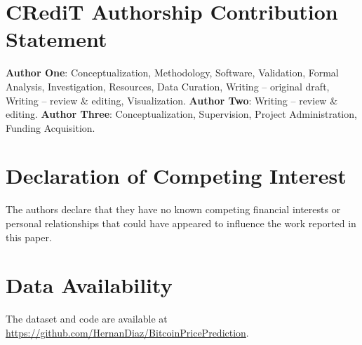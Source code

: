 \documentclass[final,3p,times,authoryear]{elsarticle}
\begin{document}
\section*{CRediT Authorship Contribution Statement}

\textbf{Author One}: Conceptualization, Methodology, Software,
Validation, Formal Analysis, Investigation, Resources, Data Curation,
Writing -- original draft, Writing -- review \& editing, Visualization.
\textbf{Author Two}: Writing -- review \& editing.
\textbf{Author Three}: Conceptualization, Supervision, Project Administration,
Funding Acquisition.

\section*{Declaration of Competing Interest}
The authors declare that they have no known competing financial interests
or personal relationships that could have appeared to influence the work
reported in this paper.

\section*{Data Availability}
The dataset and code are available at
\url{https://github.com/HernanDiaz/BitcoinPricePrediction}.



\end{document}

